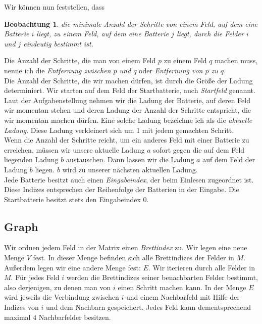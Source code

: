 \documentclass[a4paper,10pt,ngerman]{scrartcl}
\newtheorem{lemma}{Beobachtung}
\begin{document}
Wir können nun feststellen, dass
\begin{lemma}\label{observ:distances}
die minimale Anzahl der Schritte von einem Feld, auf dem eine Batterie $i$ liegt, zu einem Feld, auf dem eine Batterie $j$ liegt,
durch die Felder $i$ und $j$ eindeutig bestimmt ist.
\end{lemma}

Die Anzahl der Schritte, die man von einem Feld $p$ zu einem Feld $q$ machen muss, nenne
ich die \textit{Entfernung zwischen $p$ und $q$} oder \textit{Entfernung von $p$ zu $q$}.\\

Die Anzahl der Schritte, die wir machen dürfen, ist durch die Größe der Ladung determiniert.
Wir starten auf dem Feld der Startbatterie, auch \textit{Startfeld} genannt.
Laut der Aufgabenstellung nehmen wir die Ladung der Batterie, auf deren Feld wir momentan stehen und 
deren Ladung der Anzahl der Schritte entspricht, die wir momentan machen dürfen. 
Eine solche Ladung bezeichne ich als die \textit{aktuelle Ladung}. Diese Ladung verkleinert sich um 1
mit jedem gemachten Schritt.\\
Wenn die Anzahl der Schritte reicht, um ein anderes Feld mit einer Batterie zu erreichen, müssen wir
unsere aktuelle Ladung $a$ sofort gegen die auf dem Feld liegenden Ladung $b$ austauschen. Dann lassen
wir die Ladung $a$ auf dem Feld der Ladung $b$ liegen. $b$ wird zu unserer nächsten aktuellen Ladung.\\

\noindent
Jede Batterie besitzt auch einen \textit{Eingabeindex}, der beim Einlesen zugeordnet ist.
Diese Indizes entsprechen der Reihenfolge der Batterien in der Eingabe. Die Startbatterie besitzt stets den Eingabeindex 0.

\subsection{Graph}
Wir ordnen jedem Feld in der Matrix einen \textit{Brettindex} zu.
Wir legen eine neue Menge $V$ fest. In dieser Menge befinden sich alle Brettindizes der Felder in $M$.
Außerdem legen wir eine andere Menge fest: $E$.
Wir iterieren durch alle Felder in $M$. Für jedes Feld $i$ werden die Brettindizes seiner benachbarten Felder bestimmt,
also derjenigen, zu denen man von $i$ einen Schritt machen kann.
In der Menge $E$ wird jeweils die Verbindung zwischen $i$ und einem Nachbarfeld mit Hilfe der Indizes von $i$ 
und dem Nachbarn gespeichert. Jedes Feld kann dementsprechend maximal 4 Nachbarfelder besitzen.\\
\end{document}
